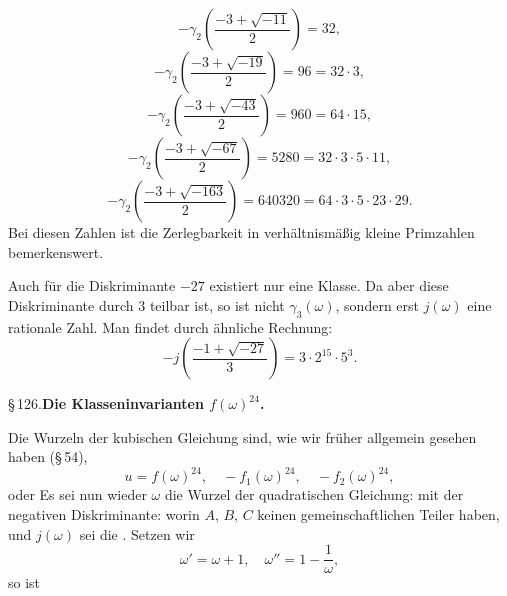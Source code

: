 \[
-\gamma_2\left(\frac{-3+\sqrt{-11}}{2}\right) = 32,
\]
\[
-\gamma_2\left(\frac{-3+\sqrt{-19}}{2}\right) = 96 = 32\cdot 3,
\]
\[
-\gamma_2\left(\frac{-3+\sqrt{-43}}{2}\right) = 960 = 64\cdot 15,
\]
\[
-\gamma_2\left(\frac{-3+\sqrt{-67}}{2}\right) = 5280 = 32\cdot 3\cdot 5\cdot 11,
\]
\[
-\gamma_2\left(\frac{-3+\sqrt{-163}}{2}\right) = 640320 = 64\cdot 3\cdot 5\cdot 23\cdot 29.
\]
Bei diesen Zahlen ist die Zerlegbarkeit in verh\"altnism\"a{\ss}ig kleine Primzahlen bemerkenswert.

Auch f\"ur die Diskriminante $-27$ existiert nur eine Klasse. Da aber diese Diskriminante durch 3 teilbar ist, so ist nicht $\gamma_3(\omega)$, sondern erst $j(\omega)$ eine rationale Zahl. Man findet durch \"ahnliche Rechnung:
\[
-j\left(\frac{-1+\sqrt{-27}}{3}\right) = 3\cdot 2^{15}\cdot 5^3.
\]

\S\,126.\quad\textbf{Die Klasseninvarianten $f(\omega)^{24}$.}

Die Wurzeln der kubischen Gleichung
sind, wie wir fr\"uher allgemein gesehen haben (\S\,54),
\[
u = f(\omega)^{24}, \quad -f_1(\omega)^{24}, \quad -f_2(\omega)^{24},
\]
oder
Es sei nun wieder $\omega$ die Wurzel der quadratischen Gleichung:
mit der negativen Diskriminante:
worin $A$, $B$, $C$ keinen gemeinschaftlichen Teiler haben, und $j(\omega)$ sei die . Setzen wir
\[
\omega' = \omega+1, \quad \omega'' = 1-\frac{1}{\omega},
\]
so ist
